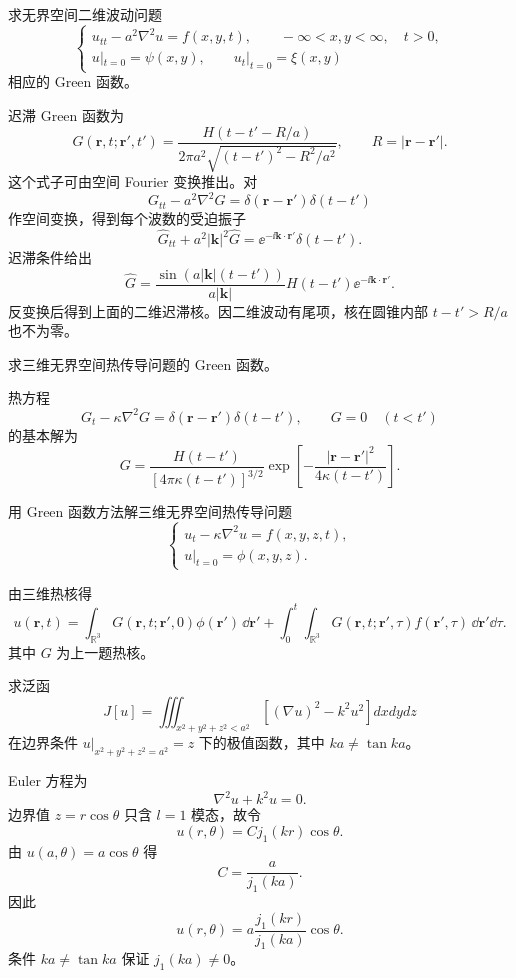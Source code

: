 \begin{question}
求无界空间二维波动问题
\[
\begin{cases}
u_{tt}-a^2\nabla^2u=f(x,y,t),\qquad -\infty<x,y<\infty,
\quad t>0,\\
u|_{t=0}=\psi(x,y),\qquad u_t|_{t=0}=\xi(x,y)
\end{cases}
\]
相应的 Green 函数。
\begin{solution}
迟滞 Green 函数为
\[
G(\bm r,t;\bm r',t')=
\frac{H(t-t'-R/a)}{2\pi a^2\sqrt{(t-t')^2-R^2/a^2}},
\qquad R=|\bm r-\bm r'|.
\]
这个式子可由空间 Fourier 变换推出。对
\[
G_{tt}-a^2\nabla^2G=\delta(\bm r-\bm r')\delta(t-t')
\]
作空间变换，得到每个波数的受迫振子
\[
\hat G_{tt}+a^2|\bm k|^2\hat G=\ee^{-\ii\bm k\cdot\bm r'}\delta(t-t').
\]
迟滞条件给出
\[
\hat G=\frac{\sin(a|\bm k|(t-t'))}{a|\bm k|}H(t-t')\ee^{-\ii\bm k\cdot\bm r'}.
\]
反变换后得到上面的二维迟滞核。因二维波动有尾项，核在圆锥内部 \(t-t'>R/a\) 也不为零。
\end{solution}
\end{question}

\begin{question}
求三维无界空间热传导问题的 Green 函数。
\begin{solution}
热方程
\[
G_t-\kappa\nabla^2G=\delta(\bm r-\bm r')\delta(t-t'),\qquad G=0\quad(t<t')
\]
的基本解为
\[
G=\frac{H(t-t')}{[4\pi\kappa(t-t')]^{3/2}}
\exp\left[-\frac{|\bm r-\bm r'|^2}{4\kappa(t-t')}\right].
\]
\end{solution}
\end{question}

\begin{question}
用 Green 函数方法解三维无界空间热传导问题
\[
\begin{cases}
u_t-\kappa\nabla^2u=f(x,y,z,t),\\
u|_{t=0}=\phi(x,y,z).
\end{cases}
\]
\begin{solution}
由三维热核得
\[
u(\bm r,t)=\int_{\mathbb R^3}G(\bm r,t;\bm r',0)\phi(\bm r')\,\dd{\bm r'}
+\int_0^t\int_{\mathbb R^3}G(\bm r,t;\bm r',\tau)f(\bm r',\tau)\,\dd{\bm r'}\dd{\tau}.
\]
其中 \(G\) 为上一题热核。
\end{solution}
\end{question}

\begin{question}
求泛函
\[
J[u]=\iiint_{x^2+y^2+z^2<a^2}\left[(\nabla u)^2-k^2u^2\right]dxdydz
\]
在边界条件 \(u|_{x^2+y^2+z^2=a^2}=z\) 下的极值函数，其中 \(ka\ne\tan ka\)。
\begin{solution}
Euler 方程为
\[
\nabla^2u+k^2u=0.
\]
边界值 \(z=r\cos\theta\) 只含 \(l=1\) 模态，故令
\[
u(r,\theta)=Cj_1(kr)\cos\theta.
\]
由 \(u(a,\theta)=a\cos\theta\) 得
\[
C=\frac{a}{j_1(ka)}.
\]
因此
\[
u(r,\theta)=a\frac{j_1(kr)}{j_1(ka)}\cos\theta.
\]
条件 \(ka\ne\tan ka\) 保证 \(j_1(ka)\ne0\)。
\end{solution}
\end{question}

